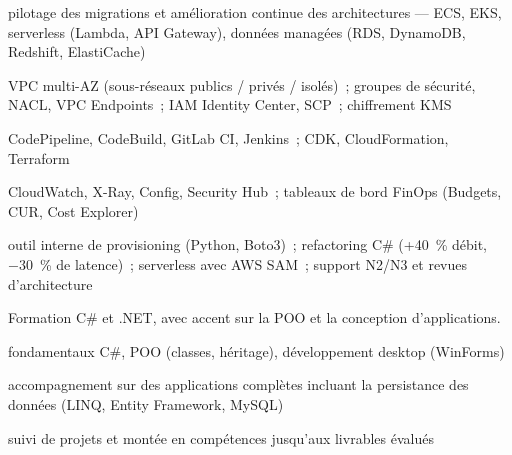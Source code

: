 \begin{cvitemize}
  \item {} pilotage des migrations et am\'elioration continue des architectures --- ECS, EKS, serverless (Lambda, API Gateway), donn\'ees manag\'ees (RDS, DynamoDB, Redshift, ElastiCache)
  \item {} VPC multi-AZ (sous-r\'eseaux publics / priv\'es / isol\'es)~; groupes de s\'ecurit\'e, NACL, VPC Endpoints~; IAM Identity Center, SCP~; chiffrement KMS
  \item {} CodePipeline, CodeBuild, GitLab CI, Jenkins~; CDK, CloudFormation, Terraform
  \item {} CloudWatch, X-Ray, Config, Security Hub~; tableaux de bord FinOps (Budgets, CUR, Cost Explorer)
  \item {} outil interne de provisioning (Python, Boto3)~; refactoring C\# (+40~\% d\'ebit, $-30$~\% de latence)~; serverless avec AWS SAM~; support N2/N3 et revues d'architecture
\end{cvitemize}

\cvJobSeparator


Formation C\# et .NET, avec accent sur la POO et la conception d'applications.

\begin{cvitemize}
  \item {} fondamentaux C\#, POO (classes, h\'eritage), d\'eveloppement desktop (WinForms)
  \item {} accompagnement sur des applications compl\`etes incluant la persistance des donn\'ees (LINQ, Entity Framework, MySQL)
  \item {} suivi de projets et mont\'ee en comp\'etences jusqu'aux livrables \'evalu\'es
\end{cvitemize}

\cvJobSeparator


